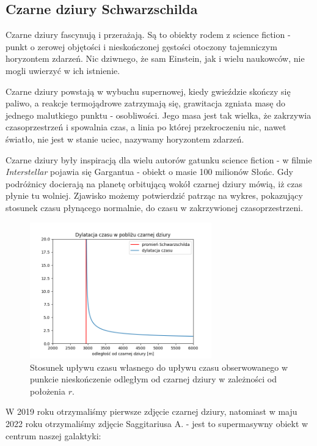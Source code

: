 \subsection{Czarne dziury Schwarzschilda}

Czarne dziury fascynują i przerażają. Są to obiekty rodem z science fiction - punkt o zerowej objętości i nieskończonej gęstości otoczony tajemniczym horyzontem zdarzeń. Nic dziwnego, że sam Einstein, jak i wielu naukowców, nie mogli uwierzyć w ich istnienie.

Czarne dziury powstają w wybuchu supernowej, kiedy gwieździe skończy się paliwo, a reakcje termojądrowe zatrzymają się, grawitacja zgniata masę do jednego malutkiego punktu - osobliwości. Jego masa jest tak wielka, że zakrzywia czasoprzestrzeń i spowalnia czas, a linia po której przekroczeniu nic, nawet światło, nie jest w stanie uciec, nazywamy horyzontem zdarzeń. 

Czarne dziury były inspiracją dla wielu autorów gatunku science fiction - w filmie \emph{Interstellar} pojawia się Gargantua - obiekt o masie 100 milionów Słońc. Gdy podróżnicy docierają na planetę orbitującą wokół czarnej dziury mówią, iż czas płynie tu wolniej. Zjawisko możemy potwierdzić patrząc na wykres, pokazujący stosunek czasu płynącego normalnie, do czasu w zakrzywionej czasoprzestrzeni.

\renewcommand{\figurename}{Wykres}
\begin{figure}[h]
  \centering
  \includegraphics[width=0.7\textwidth]{ilustracje/Time_near_black_hole.png}
  \caption{Stosunek upływu czasu własnego do upływu czasu obserwowanego w punkcie nieskończenie odległym od czarnej dziury w zależności od położenia $r$.}
\end{figure}

W 2019 roku otrzymaliśmy pierwsze zdjęcie czarnej dziury, natomiast w maju 2022 roku otrzymaliśmy zdjęcie Saggitariusa A. - jest to supermasywny obiekt w centrum naszej galaktyki:

